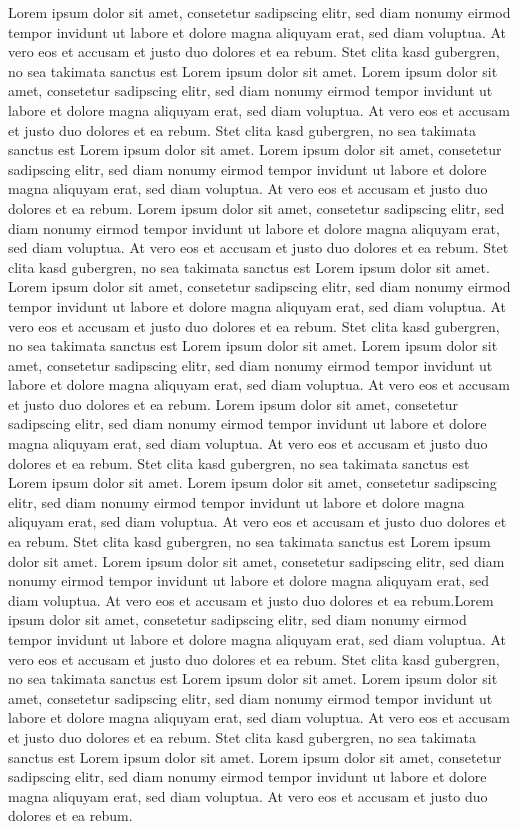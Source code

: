 \documentclass[preprint,journal]{vgtc}       %
\begin{document}
Lorem ipsum dolor sit amet, consetetur sadipscing elitr, sed diam
nonumy eirmod tempor invidunt ut labore et dolore magna aliquyam erat,
sed diam voluptua. At vero eos et accusam et justo duo dolores et ea
rebum. Stet clita kasd gubergren, no sea takimata sanctus est Lorem
ipsum dolor sit amet. Lorem ipsum dolor sit amet, consetetur
sadipscing elitr, sed diam nonumy eirmod tempor invidunt ut labore et
dolore magna aliquyam erat, sed diam voluptua. At vero eos et accusam
et justo duo dolores et ea rebum. Stet clita kasd gubergren, no sea
takimata sanctus est Lorem ipsum dolor sit amet. Lorem ipsum dolor sit
amet, consetetur sadipscing elitr, sed diam nonumy eirmod tempor
invidunt ut labore et dolore magna aliquyam erat, sed diam
voluptua. At vero eos et accusam et justo duo dolores et ea
rebum.
Lorem ipsum dolor sit amet, consetetur sadipscing elitr, sed diam
nonumy eirmod tempor invidunt ut labore et dolore magna aliquyam erat,
sed diam voluptua. At vero eos et accusam et justo duo dolores et ea
rebum. Stet clita kasd gubergren, no sea takimata sanctus est Lorem
ipsum dolor sit amet. Lorem ipsum dolor sit amet, consetetur
sadipscing elitr, sed diam nonumy eirmod tempor invidunt ut labore et
dolore magna aliquyam erat, sed diam voluptua. At vero eos et accusam
et justo duo dolores et ea rebum. Stet clita kasd gubergren, no sea
takimata sanctus est Lorem ipsum dolor sit amet. Lorem ipsum dolor sit
amet, consetetur sadipscing elitr, sed diam nonumy eirmod tempor
invidunt ut labore et dolore magna aliquyam erat, sed diam
voluptua. At vero eos et accusam et justo duo dolores et ea
rebum.
Lorem ipsum dolor sit amet, consetetur sadipscing elitr, sed diam
nonumy eirmod tempor invidunt ut labore et dolore magna aliquyam erat,
sed diam voluptua. At vero eos et accusam et justo duo dolores et ea
rebum. Stet clita kasd gubergren, no sea takimata sanctus est Lorem
ipsum dolor sit amet. Lorem ipsum dolor sit amet, consetetur
sadipscing elitr, sed diam nonumy eirmod tempor invidunt ut labore et
dolore magna aliquyam erat, sed diam voluptua. At vero eos et accusam
et justo duo dolores et ea rebum. Stet clita kasd gubergren, no sea
takimata sanctus est Lorem ipsum dolor sit amet. Lorem ipsum dolor sit
amet, consetetur sadipscing elitr, sed diam nonumy eirmod tempor
invidunt ut labore et dolore magna aliquyam erat, sed diam
voluptua. At vero eos et accusam et justo duo dolores et ea
rebum.Lorem ipsum dolor sit amet, consetetur sadipscing elitr, sed diam
nonumy eirmod tempor invidunt ut labore et dolore magna aliquyam erat,
sed diam voluptua. At vero eos et accusam et justo duo dolores et ea
rebum. Stet clita kasd gubergren, no sea takimata sanctus est Lorem
ipsum dolor sit amet. Lorem ipsum dolor sit amet, consetetur
sadipscing elitr, sed diam nonumy eirmod tempor invidunt ut labore et
dolore magna aliquyam erat, sed diam voluptua. At vero eos et accusam
et justo duo dolores et ea rebum. Stet clita kasd gubergren, no sea
takimata sanctus est Lorem ipsum dolor sit amet. Lorem ipsum dolor sit
amet, consetetur sadipscing elitr, sed diam nonumy eirmod tempor
invidunt ut labore et dolore magna aliquyam erat, sed diam
voluptua. At vero eos et accusam et justo duo dolores et ea
rebum.
\end{document}
